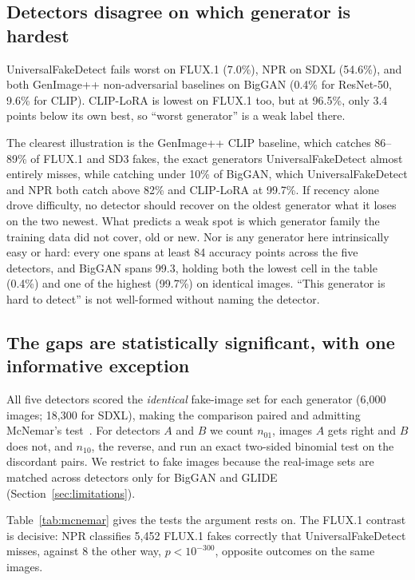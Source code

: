 \documentclass[3p,times,procedia]{elsarticle}
\begin{document}
\subsection{Detectors disagree on which generator is hardest}
\label{sec:finding1}

UniversalFakeDetect fails worst on FLUX.1 (7.0\%), NPR on SDXL (54.6\%),
and both GenImage++ non-adversarial baselines on BigGAN (0.4\% for
ResNet-50, 9.6\% for CLIP). CLIP-LoRA is lowest on FLUX.1 too, but at
96.5\%, only 3.4 points below its own best, so ``worst generator'' is a
weak label there.

The clearest illustration is the GenImage++ CLIP baseline, which catches
86--89\% of FLUX.1 and SD3 fakes, the exact generators UniversalFakeDetect
almost entirely misses, while catching under 10\% of BigGAN, which
UniversalFakeDetect and NPR both catch above 82\% and CLIP-LoRA at 99.7\%.
If recency alone drove difficulty, no detector should recover on the
oldest generator what it loses on the two newest. What predicts a weak
spot is which generator family the training data did not cover, old or
new. Nor is any generator here intrinsically easy or hard: every one spans
at least 84 accuracy points across the five detectors, and BigGAN spans
99.3, holding both the lowest cell in the table (0.4\%) and one of the
highest (99.7\%) on identical images. ``This generator is hard to detect''
is not well-formed without naming the detector.

\subsection{The gaps are statistically significant, with one informative
exception}
\label{sec:significance}

All five detectors scored the \emph{identical} fake-image set for each
generator (6{,}000 images; 18{,}300 for SDXL), making the comparison
paired and admitting McNemar's test~\cite{mcnemar1947}. For detectors $A$
and $B$ we count $n_{01}$, images $A$ gets right and $B$ does not, and
$n_{10}$, the reverse, and run an exact two-sided binomial test on the
discordant pairs. We restrict to fake images because the real-image sets
are matched across detectors only for BigGAN and GLIDE
(Section~\ref{sec:limitations}).

Table~\ref{tab:mcnemar} gives the tests the argument rests on. The FLUX.1
contrast is decisive: NPR classifies 5{,}452 FLUX.1 fakes correctly that
UniversalFakeDetect misses, against 8 the other way, $p<10^{-300}$,
opposite outcomes on the same images.
\end{document}
